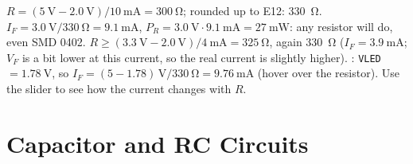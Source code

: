 \begin{solution}
\begin{talist}
\ta $R = (\SI{5}{\volt}-\SI{2.0}{\volt})/\SI{10}{\milli\ampere} = \SI{300}{\ohm}$; rounded up to E12: \SI{330}{\ohm}.
\ta $I_F = \SI{3.0}{\volt}/\SI{330}{\ohm} = \SI{9.1}{\milli\ampere}$, $P_R = \SI{3.0}{\volt}\cdot\SI{9.1}{\milli\ampere} = \SI{27}{\milli\watt}$:
    any resistor will do, even SMD 0402.
\ta $R \geq (\SI{3.3}{\volt}-\SI{2.0}{\volt})/\SI{4}{\milli\ampere} = \SI{325}{\ohm}$, again \SI{330}{\ohm}
    ($I_F = \SI{3.9}{\milli\ampere}$; $V_F$ is a bit lower at this current, so the real current is slightly higher).
\ta {}: \texttt{VLED} $=\SI{1.78}{\volt}$, so $I_F = (5-1.78)\,\si{\volt}/\SI{330}{\ohm} = \SI{9.76}{\milli\ampere}$
    (hover over the resistor). Use the slider to see how the current changes with $R$.
\end{talist}
\end{solution}

\section{Capacitor and RC Circuits}


